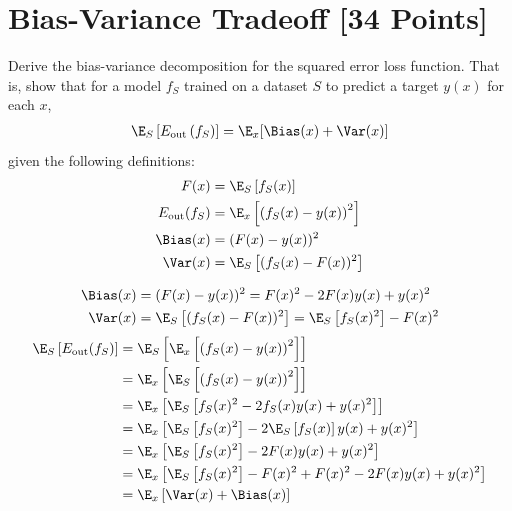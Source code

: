 
\newpage
\section{Bias-Variance Tradeoff [34 Points]}

\begin{problem}[5]
  Derive the bias-variance decomposition for the squared error loss function. That is, show that for a model $f_S$ trained on a dataset $S$ to predict a target $y(x)$ for each $x$,
  \begin{align*}
    \E_S \left[E_\text{out}\left(f_S\right)\right] = \E_x[\Bias(x) + \Var(x)]
  \end{align*}
  given the following definitions:
  \begin{align*}
    F(x) &= \E_S\left[f_S(x) \right] \\
    E_\text{out}(f_S) &= \E_x\left[\left(f_S(x) - y(x)\right)^2\right] \\
    \Bias(x) &= (F(x) - y(x))^2 \\
    \Var(x) &= \E_S\left[(f_S(x)-F(x))^2\right]
  \end{align*}
\end{problem}

\begin{solution}
  \begin{align*}
    \Bias(x) &= (F(x) - y(x))^2 = F(x)^2 - 2 F(x) y(x) + y(x)^2 \\
    \Var(x) &= \E_S\left[(f_S(x)-F(x))^2\right] = \E_S \left[ f_S(x)^2 \right] - F(x)^2
  \end{align*}
  \begin{align*}
    \E_S \left[ E_\text{out}(f_S) \right]
      &= \E_S \left[ \E_x \left[\left(f_S(x) - y(x)\right)^2\right] \right] \\
      &= \E_x \left[ \E_S \left[\left(f_S(x) - y(x)\right)^2\right] \right] \\
      &= \E_x \left[ \E_S \left[ f_S(x)^2 - 2 f_S(x) y(x) + y(x)^2 \right] \right] \\
      &= \E_x \left[ \E_S \left[ f_S(x)^2 \right] - 2 \E_S \left[ f_S(x) \right] y(x) + y(x)^2 \right] \\
      &= \E_x \left[ \E_S \left[ f_S(x)^2 \right] - 2 F(x) y(x) + y(x)^2 \right] \\
      &= \E_x \left[ \E_S \left[ f_S(x)^2 \right] - F(x)^2 + F(x)^2 - 2 F(x) y(x) + y(x)^2 \right] \\
      &= \E_x \left[ \Var(x) + \Bias(x) \right]
  \end{align*}
\end{solution}

